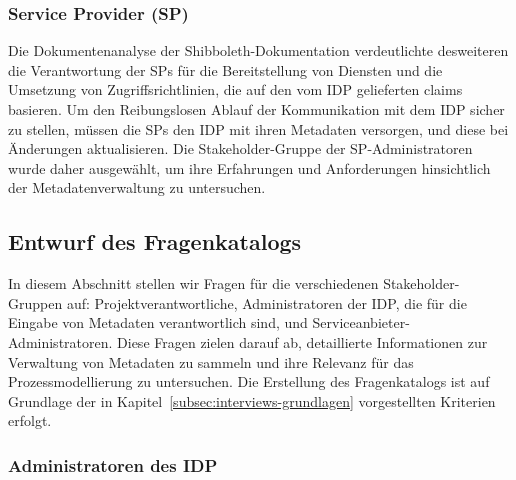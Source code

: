 \documentclass[a4paper, fontsize=12pt]{scrartcl}
\begin{document}
\subsubsection{Service Provider (SP)}
Die Dokumentenanalyse der Shibboleth-Dokumentation verdeutlichte desweiteren die Verantwortung der SPs für die Bereitstellung von Diensten und die Umsetzung von Zugriffsrichtlinien, die auf den vom IDP gelieferten claims basieren.
Um den Reibungslosen Ablauf der Kommunikation mit dem IDP sicher zu stellen, müssen die SPs den IDP mit ihren Metadaten versorgen, und diese bei Änderungen aktualisieren.
Die Stakeholder-Gruppe der SP-Administratoren wurde daher ausgewählt, um ihre Erfahrungen und Anforderungen hinsichtlich der Metadatenverwaltung zu untersuchen.

\subsection{Entwurf des Fragenkatalogs}\label{subsubsec:entwurf-fragenkatalog}

In diesem Abschnitt stellen wir Fragen für die verschiedenen Stakeholder-Gruppen auf: Projektverantwortliche, Administratoren der IDP, die für die Eingabe von Metadaten verantwortlich sind, und Serviceanbieter-Administratoren. 
Diese Fragen zielen darauf ab, detaillierte Informationen zur Verwaltung von Metadaten zu sammeln und ihre Relevanz für das Prozessmodellierung zu untersuchen.
Die Erstellung des Fragenkatalogs ist auf Grundlage der in Kapitel~\ref{subsec:interviews-grundlagen} vorgestellten Kriterien erfolgt.

\subsubsection{Administratoren des IDP}
\end{document}
